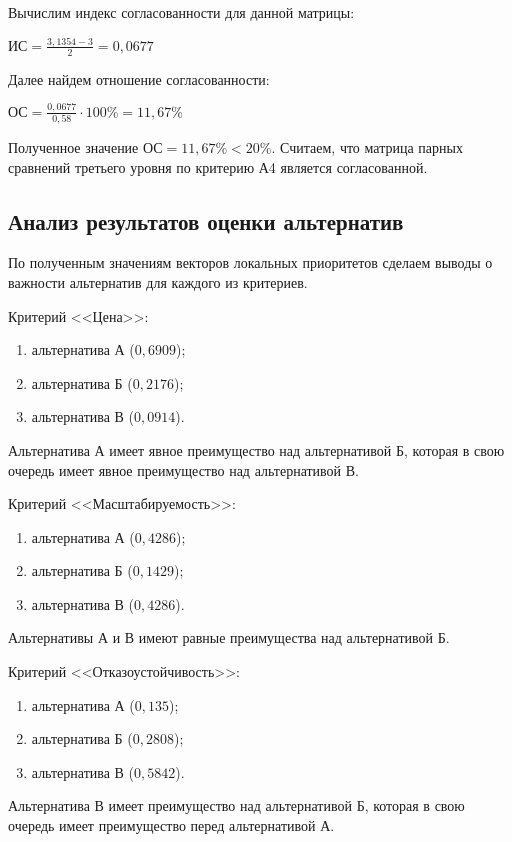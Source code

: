 Вычислим индекс согласованности для данной матрицы:

$\text{ИС} = \frac{3,1354 - 3}{2} = 0,0677$

Далее найдем отношение согласованности:

$\text{ОС} = \frac{0,0677}{0,58} \cdot 100\% = 11,67\%$

Полученное значение $\text{ОС} = 11,67\% < 20\%$.
Считаем, что матрица парных сравнений третьего уровня по критерию А4 является согласованной.

\subsection{Анализ результатов оценки альтернатив}

По полученным значениям векторов локальных приоритетов сделаем выводы о важности альтернатив для каждого из критериев.

Критерий <<Цена>>:
\begin{enumerate}
  \item альтернатива А ($0,6909$);
  \item альтернатива Б ($0,2176$);
  \item альтернатива В ($0,0914$).
\end{enumerate}

Альтернатива А имеет явное преимущество над альтернативой Б, которая в свою очередь имеет явное преимущество над альтернативой В.

Критерий <<Масштабируемость>>:
\begin{enumerate}
  \item альтернатива А ($0,4286$);
  \item альтернатива Б ($0,1429$);
  \item альтернатива В ($0,4286$).
\end{enumerate}

Альтернативы А и В имеют равные преимущества над альтернативой Б.

Критерий <<Отказоустойчивость>>:
\begin{enumerate}
  \item альтернатива А ($0,135$);
  \item альтернатива Б ($0,2808$);
  \item альтернатива В ($0,5842$).
\end{enumerate}

Альтернатива В имеет преимущество над альтернативой Б, которая в свою очередь имеет преимущество перед альтернативой А.

